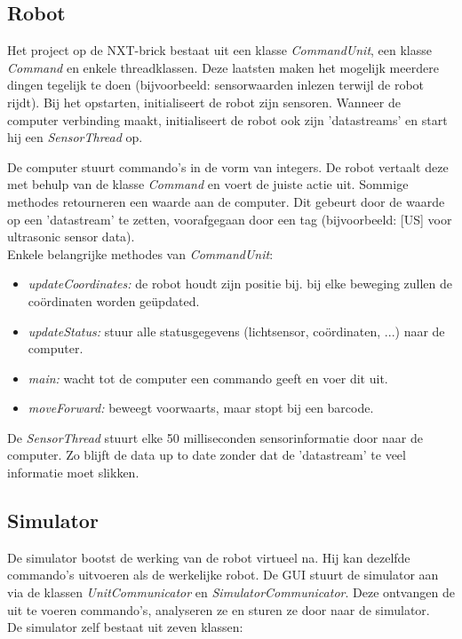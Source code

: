\documentclass[tt3]{penoverslag}
\begin{document}
\subsection{Robot} %
\label{ssec:robot}
Het project op de NXT-brick bestaat uit een klasse \textit{CommandUnit}, een klasse \textit{Command} en enkele threadklassen. Deze laatsten maken het mogelijk meerdere dingen tegelijk te doen (bijvoorbeeld: sensorwaarden inlezen terwijl de robot rijdt). Bij het opstarten, initialiseert de robot zijn sensoren. Wanneer de computer verbinding maakt, initialiseert de robot ook zijn 'datastreams' en start hij een \textit{SensorThread} op.

De computer stuurt commando's in de vorm van integers. De robot vertaalt deze met behulp van de klasse \textit{Command} en voert de juiste actie uit. Sommige methodes retourneren een waarde aan de computer. Dit gebeurt door de waarde op een 'datastream' te zetten, voorafgegaan door een tag (bijvoorbeeld: [US] voor ultrasonic sensor data).\\

Enkele belangrijke methodes van \textit{CommandUnit}:
\begin{itemize}
\item \textit{updateCoordinates:} de robot houdt zijn positie bij. bij elke beweging zullen de co\"ordinaten worden ge\"updated.
\item \textit{updateStatus:} stuur alle statusgegevens (lichtsensor, co\"ordinaten, ...) naar de computer.
\item \textit{main:} wacht tot de computer een commando geeft en voer dit uit.
\item \textit{moveForward:} beweegt voorwaarts, maar stopt bij een barcode.
\end{itemize}

De \textit{SensorThread} stuurt elke 50 milliseconden sensorinformatie door naar de computer. Zo blijft de data up to date zonder dat de 'datastream' te veel informatie moet slikken.

\subsection{Simulator} %
\label{ssec:simulator}
De simulator bootst de werking van de robot virtueel na. Hij kan dezelfde commando's uitvoeren als de werkelijke robot. De GUI stuurt de simulator aan via de klassen \textit{UnitCommunicator} en \textit{SimulatorCommunicator}. Deze ontvangen de uit te voeren commando's, analyseren ze en sturen ze door naar de simulator.
\\
De simulator zelf bestaat uit zeven klassen:
\end{document}
